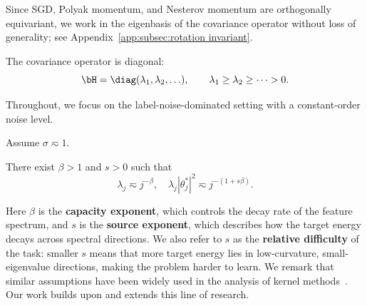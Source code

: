 \documentclass[11pt]{article}
\begin{document}
Since SGD, Polyak momentum, and Nesterov momentum are orthogonally equivariant, we work in the eigenbasis of the covariance operator without loss of generality; see Appendix~\ref{app:subsec:rotation invariant}.

\begin{assumption}
\label{ass:diagonal-covariance}
The covariance operator is diagonal:
\begin{equation}
\label{eqn:diagonal-hessian}
\bH=\diag(\lambda_1,\lambda_2,\ldots),
\qquad
\lambda_1\geq\lambda_2\geq\cdots>0.
\end{equation}
\end{assumption}

Throughout, we focus on the label-noise-dominated setting with a constant-order noise level.
\begin{assumption}
Assume \(\sigma\eqsim1\).
\end{assumption}

\begin{assumption} \label{ass:power-law}
    There exist  $\beta>1$ and $s>0$ such that 
    \[
        \lambda_j \eqsim j^{-\beta},\quad \lambda_j |\theta^*_j|^2\eqsim j^{-(1+s\beta)}.
    \]
\end{assumption}
Here \(\beta\) is the \textbf{capacity exponent}, which controls the decay rate of the feature spectrum, and \(s\) is the \textbf{source exponent}, which describes how the target energy decays across spectral directions. 
We also refer to \(s\) as the \textbf{relative difficulty} of the task: smaller \(s\) means that more target energy lies in low-curvature, small-eigenvalue directions, making the problem harder to learn. We remark that similar assumptions have been widely used in the analysis of kernel methods~\citep{caponnetto2005fast,caponnetto2007optimal,spigler2020asymptotic,bordelon2020spectrum,maloney2022solvable}.  
Our work builds upon and extends this line of research. 
\end{document}
